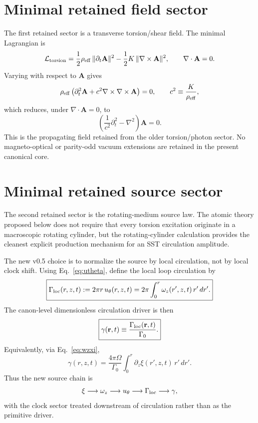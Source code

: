 \documentclass[11pt,a4paper]{article}
\begin{document}
\section{Minimal retained field sector}
The first retained sector is a transverse torsion/shear field. The minimal Lagrangian is
\begin{equation}
\label{eq:Ltorsion}
\mathcal{L}_{\rm torsion}
=
\frac12\rho_{\rm eff}\,\lVert \partial_t \mathbf{A}\rVert^2
-
\frac12 K\,\lVert \nabla\times\mathbf{A}\rVert^2,
\qquad
\nabla\cdot\mathbf{A}=0.
\end{equation}
Varying with respect to $\mathbf{A}$ gives
\begin{equation}
\label{eq:Awave-pre}
\rho_{\rm eff}\left(\partial_t^2\mathbf{A}+c^2\nabla\times\nabla\times\mathbf{A}\right)=0,
\qquad
c^2\equiv \frac{K}{\rho_{\rm eff}},
\end{equation}
which reduces, under $\nabla\cdot\mathbf{A}=0$, to
\begin{equation}
\label{eq:Awave}
\boxed{
\left(\frac{1}{c^2}\partial_t^2-\nabla^2\right)\mathbf{A}=0.
}
\end{equation}
This is the propagating field retained from the older torsion/photon sector. No magneto-optical or parity-odd vacuum extensions are retained in the present canonical core.

\section{Minimal retained source sector}
The second retained sector is the rotating-medium source law. The atomic theory proposed below does not require that every torsion excitation originate in a macroscopic rotating cylinder, but the rotating-cylinder calculation provides the cleanest explicit production mechanism for an SST circulation amplitude.

The new v0.5 choice is to normalize the source by local circulation, not by local clock shift. Using Eq.~\eqref{eq:utheta}, define the local loop circulation by
\begin{equation}
\label{eq:GammaLoc}
\boxed{
\Gamma_{\rm loc}(r,z,t)
:=
2\pi r\,u_\theta(r,z,t)
=
2\pi\int_0^r \omega_z(r',z,t)\,r'\,dr'.
}
\end{equation}
The canon-level dimensionless circulation driver is then
\begin{equation}
\label{eq:gammaDef}
\boxed{
\gamma(\mathbf r,t)
\equiv
\frac{\Gamma_{\rm loc}(\mathbf r,t)}{\Gamma_0}.
}
\end{equation}
Equivalently, via Eq.~\eqref{eq:wzxi},
\begin{equation}
\label{eq:gammaXi}
\gamma(r,z,t)
=
\frac{4\pi\Omega}{\Gamma_0}
\int_0^r \partial_z \xi(r',z,t)\,r'\,dr'.
\end{equation}
Thus the new source chain is
\begin{equation}
\label{eq:source-chain}
\xi \longrightarrow \omega_z \longrightarrow u_\theta \longrightarrow \Gamma_{\rm loc} \longrightarrow \gamma,
\end{equation}
with the clock sector treated downstream of circulation rather than as the primitive driver.
\end{document}
